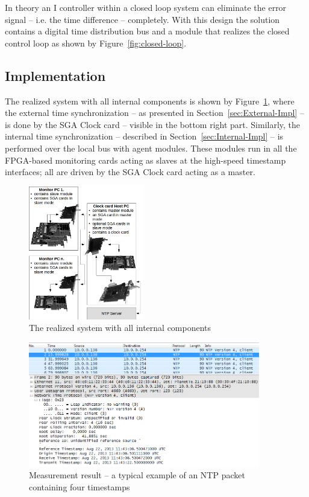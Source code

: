 \documentclass[journal]{IEEEtran}
\begin{document}
In theory an I controller within a closed loop system can eliminate the error signal -- i.e. the time difference --
completely.
With this design the solution contains a digital time distribution bus and a module that realizes the
closed control loop as shown by Figure~\ref{fig:closed-loop}.

\subsection{Implementation}

The realized system with all internal components is shown by Figure~\ref{fig:realized-system}, where the external time
synchronization -- as presented in Section~\ref{sec:External-Impl} -- is done by the SGA Clock card -- visible in the
bottom right part. Similarly, the internal time synchronization -- described in Section~\ref{sec:Internal-Impl} --
is performed over the local bus with agent modules. These modules run in all the FPGA-based monitoring cards acting as slaves at the
high-speed timestamp interfaces; all are driven by the SGA Clock card acting as a master.

\begin{figure}[H]
    \centering
    \includegraphics[width=0.45\textwidth]{figures_raw/clock_architecture.png}
    \caption{The realized system with all internal components}
    \label{fig:realized-system}
\end{figure}

\begin{figure}[!htb]
    \centering
    \includegraphics[width=0.9\textwidth]{figures_raw/pcap-NTP.png}
    \caption{Measurement result -- a typical example of an NTP packet containing four timestamps}
    \label{fig:pcap-NTP}
\end{figure}
\end{document}
